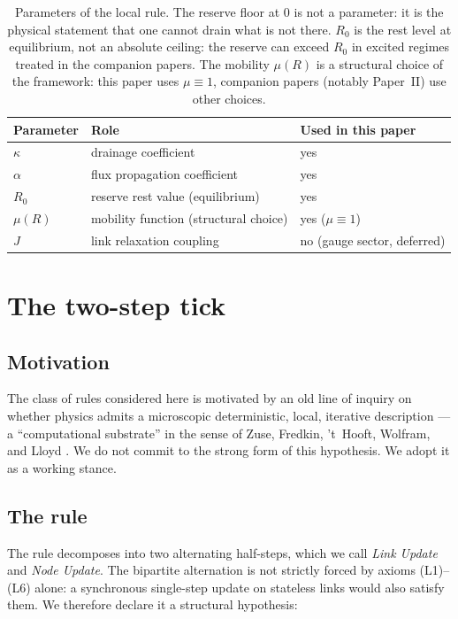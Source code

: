 \documentclass[11pt,a4paper]{article}
\begin{document}
\begin{table}[h]
\centering
\begin{tabular}{lll}
\toprule
Parameter & Role & Used in this paper\\
\midrule
$\kappa$    & drainage coefficient            & yes\\
$\alpha$    & flux propagation coefficient    & yes\\
$R_0$       & reserve rest value (equilibrium) & yes\\
$\mu(R)$    & mobility function (structural choice) & yes ($\mu \equiv 1$)\\
$J$         & link relaxation coupling        & no (gauge sector, deferred)\\
\bottomrule
\end{tabular}
\caption{Parameters of the local rule. The reserve floor at
$0$ is not a parameter: it is the physical statement that one
cannot drain what is not there. $R_0$ is the rest level at
equilibrium, not an absolute ceiling: the reserve can exceed
$R_0$ in excited regimes treated in the companion papers. The
mobility $\mu(R)$ is a structural choice of the framework: this
paper uses $\mu \equiv 1$, companion papers (notably Paper~II)
use other choices.}
\label{tab:params}
\end{table}

\section{The two-step tick}
\label{sec:tick}

\subsection*{Motivation}

The class of rules considered here is motivated by an old line
of inquiry on whether physics admits a microscopic
deterministic, local, iterative description --- a
``computational substrate'' in the sense of Zuse, Fredkin,
't~Hooft, Wolfram, and Lloyd
\cite{zuse1969,fredkin1990,thooft2016,wolfram2002,lloyd2006}.
We do not commit to the strong form of this hypothesis. We
adopt it as a working stance.

\subsection*{The rule}

The rule decomposes into two alternating half-steps, which we
call \emph{Link Update} and \emph{Node Update}. The bipartite
alternation is not strictly forced by axioms (L1)--(L6) alone:
a synchronous single-step update on stateless links would also
satisfy them. We therefore declare it a structural hypothesis:
\end{document}
